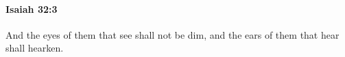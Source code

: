 
		\paragraph{Isaiah 32:3} %
			\label{ISAIAH-32-3}

			And the eyes of them that see shall not be dim, and the ears of them that hear shall hearken.


